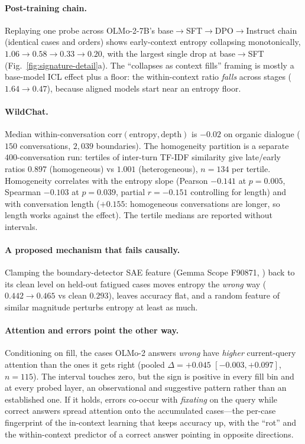 \documentclass{article}
\begin{document}
\paragraph{Post-training chain.}
Replaying one probe across OLMo-2-7B's base$\to$SFT$\to$DPO$\to$Instruct chain (identical cases
and orders) shows early-context entropy collapsing monotonically, $1.06\to0.58\to0.33\to0.20$,
with the largest single drop at base$\to$SFT (Fig.~\ref{fig:signature-detail}a). The
``collapses as context fills'' framing is mostly a base-model ICL effect plus a floor: the
within-context ratio \emph{falls} across stages ($1.64\to0.47$), because aligned models start
near an entropy floor.

\paragraph{WildChat.}
Median within-conversation $\mathrm{corr}(\text{entropy},\text{depth})$ is $-0.02$ on organic
dialogue ($150$ conversations, $2{,}039$ boundaries). The homogeneity partition is a separate
$400$-conversation run: tertiles of inter-turn TF-IDF similarity give late/early ratios $0.897$
(homogeneous) vs $1.001$ (heterogeneous), $n{=}134$ per tertile. Homogeneity correlates with
the entropy slope (Pearson $-0.141$ at $p{=}0.005$, Spearman $-0.103$ at $p{=}0.039$, partial
$r=-0.151$ controlling for length) and with conversation length ($+0.155$: homogeneous
conversations are longer, so length works against the effect). The tertile medians are reported
without intervals.

\paragraph{A proposed mechanism that fails causally.}
Clamping the boundary-detector SAE feature (Gemma Scope F90871,
\citealp{lieberum2024gemmascope}) back to its clean level on held-out fatigued cases moves
entropy the \emph{wrong} way ($0.442\to0.465$ vs clean $0.293$), leaves accuracy flat, and a
random feature of similar magnitude perturbs entropy at least as much.

\paragraph{Attention and errors point the other way.}
Conditioning on fill, the cases OLMo-2 answers \emph{wrong} have \emph{higher} current-query
attention than the ones it gets right (pooled $\Delta=+0.045$ $[-0.003,+0.097]$, $n{=}115$). The
interval touches zero, but the sign is positive in every fill bin and at every probed layer, an
observational and suggestive pattern rather than an established one. If it holds, errors
co-occur with \emph{fixating} on the query while correct answers spread attention onto the
accumulated cases---the per-case fingerprint of the in-context learning that keeps accuracy up,
with the ``rot'' and the within-context predictor of a correct answer pointing in opposite
directions.
\end{document}
